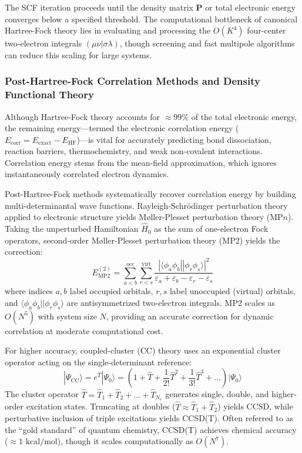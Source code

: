 \documentclass[12pt]{article}
\begin{document}
The SCF iteration proceeds until the density matrix $\mathbf{P}$ or total electronic energy converges below a specified threshold. The computational bottleneck of canonical Hartree-Fock theory lies in evaluating and processing the $O(K^4)$ four-center two-electron integrals $(\mu\nu|\sigma\lambda)$, though screening and fast multipole algorithms can reduce this scaling for large systems.

\subsubsection{Post-Hartree-Fock Correlation Methods and Density Functional Theory}

Although Hartree-Fock theory accounts for $\approx 99\%$ of the total electronic energy, the remaining energy—termed the electronic correlation energy ($E_{\text{corr}} = E_{\text{exact}} - E_{\text{HF}}$)—is vital for accurately predicting bond dissociation, reaction barriers, thermochemistry, and weak non-covalent interactions. Correlation energy stems from the mean-field approximation, which ignores instantaneously correlated electron dynamics.

Post-Hartree-Fock methods systematically recover correlation energy by building multi-determinantal wave functions. Rayleigh-Schrödinger perturbation theory applied to electronic structure yields M{\o}ller-Plesset perturbation theory (MP$n$). Taking the unperturbed Hamiltonian $\hat{H}_0$ as the sum of one-electron Fock operators, second-order M{\o}ller-Plesset perturbation theory (MP2) yields the correction:
\begin{equation}
E_{\text{MP2}}^{(2)} = \sum_{a<b}^{\text{occ}} \sum_{r<s}^{\text{virt}} \frac{|\langle \phi_a \phi_b || \phi_r \phi_s \rangle|^2}{\varepsilon_a + \varepsilon_b - \varepsilon_r - \varepsilon_s}
\end{equation}
where indices $a,b$ label occupied orbitals, $r,s$ label unoccupied (virtual) orbitals, and $\langle \phi_a \phi_b || \phi_r \phi_s \rangle$ are antisymmetrized two-electron integrals. MP2 scales as $O(N^5)$ with system size $N$, providing an accurate correction for dynamic correlation at moderate computational cost.

For higher accuracy, coupled-cluster (CC) theory uses an exponential cluster operator acting on the single-determinant reference:
\begin{equation}
|\Psi_{\text{CC}}\rangle = e^{\hat{T}} |\Psi_0\rangle = \left( 1 + \hat{T} + \frac{1}{2!}\hat{T}^2 + \frac{1}{3!}\hat{T}^3 + \dots \right) |\Psi_0\rangle
\end{equation}
The cluster operator $\hat{T} = \hat{T}_1 + \hat{T}_2 + \dots + \hat{T}_{N_e}$ generates single, double, and higher-order excitation states. Truncating at doubles ($\hat{T} \approx \hat{T}_1 + \hat{T}_2$) yields CCSD, while perturbative inclusion of triple excitations yields CCSD(T). Often referred to as the ``gold standard'' of quantum chemistry, CCSD(T) achieves chemical accuracy ($\approx 1\text{ kcal/mol}$), though it scales computationally as $O(N^7)$.
\end{document}
